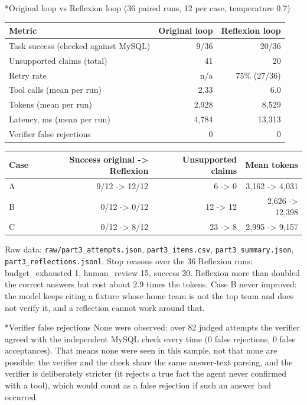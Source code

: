 \documentclass[11pt]{article}
\makeatletter
\renewcommand\subsection{\@startsection{subsection}{2}{\z@}{-2.2ex \@plus -1ex \@minus -.2ex}{0.8ex \@plus.2ex}{\normalfont\fontsize{12}{14.5}\selectfont\bfseries}}
\makeatother
\begin{document}
\subsection*{Original loop vs Reflexion loop (36 paired runs, 12 per case, temperature 0.7)}
\begin{center}
{\small
\begin{tabular}{lrr}
\toprule
\textbf{Metric} & \textbf{Original loop} & \textbf{Reflexion loop} \\
\midrule
Task success (checked against MySQL) & 9/36 & 20/36 \\
Unsupported claims (total) & 41 & 20 \\
Retry rate & n/a & 75\% (27/36) \\
Tool calls (mean per run) & 2.33 & 6.0 \\
Tokens (mean per run) & 2,928 & 8,529 \\
Latency, ms (mean per run) & 4,784 & 13,313 \\
Verifier false rejections & 0 & 0 \\
\bottomrule
\end{tabular}}
\end{center}
\begin{center}
{\small
\begin{tabular}{lrrr}
\toprule
\textbf{Case} & \textbf{Success original -> Reflexion} & \textbf{Unsupported claims} & \textbf{Mean tokens} \\
\midrule
A & 9/12 -> 12/12 & 6 -> 0 & 3,162 -> 4,031 \\
B & 0/12 -> 0/12 & 12 -> 12 & 2,626 -> 12,398 \\
C & 0/12 -> 8/12 & 23 -> 8 & 2,995 -> 9,157 \\
\bottomrule
\end{tabular}}
\end{center}
Raw data: \texttt{raw/\allowbreak{}part3\_\allowbreak{}attempts.json}, \texttt{part3\_\allowbreak{}items.csv}, \texttt{part3\_\allowbreak{}summary.json}, \texttt{part3\_\allowbreak{}reflections.jsonl}. Stop reasons over the 36 Reflexion runs: budget\_exhausted 1, human\_review 15, success 20. Reflexion more than doubled the correct answers but cost about 2.9 times the tokens. Case B never improved: the model keeps citing a fixture whose home team is not the top team and does not verify it, and a reflection cannot work around that.

\subsection*{Verifier false rejections}
None were observed: over 82 judged attempts the verifier agreed with the independent MySQL check every time (0 false rejections, 0 false acceptances). That means none were seen in this sample, not that none are possible: the verifier and the check share the same answer-text parsing, and the verifier is deliberately stricter (it rejects a true fact the agent never confirmed with a tool), which would count as a false rejection if such an answer had occurred.
\end{document}
